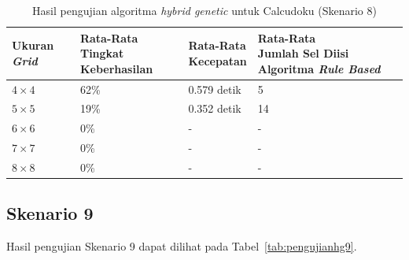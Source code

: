 \begin{table}
\centering
\captionsetup{justification=centering}
\caption[Hasil pengujian algoritma \textit{hybrid genetic} untuk Calcudoku (Skenario 8)]{Hasil pengujian algoritma \textit{hybrid genetic} untuk Calcudoku (Skenario 8)}
\begin{tabular}{| l | l | l | l |}
\hline
Ukuran \textit{Grid} & \makecell[l]{Rata-Rata \\ Tingkat Keberhasilan} & \makecell[l]{Rata-Rata \\ Kecepatan} & \makecell[l]{Rata-Rata \\ Jumlah Sel Diisi Algoritma \textit{Rule Based}} \\
\hline \hline
\begin{math}4 \times 4\end{math} & 62\% & 0.579 detik & 5 \\
\hline
\begin{math}5 \times 5\end{math} & 19\% & 0.352 detik & 14 \\
\hline
\begin{math}6 \times 6\end{math} & 0\% & - & - \\
\hline
\begin{math}7 \times 7\end{math} & 0\% & - & - \\
\hline
\begin{math}8 \times 8\end{math} & 0\% & - & - \\
\hline
\end{tabular}
\label{tab:pengujianhg8}
\end{table}

\subsection{Skenario 9}
\label{sec:skenario9}

Hasil pengujian Skenario 9 dapat dilihat pada Tabel~\ref{tab:pengujianhg9}.

